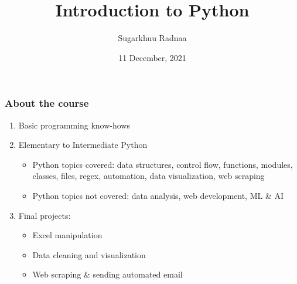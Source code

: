 \documentclass{beamer}
\title[Python Intro]{Introduction to Python} %
\author{Sugarkhuu Radnaa} %
\institute[] %
{
Py4Econ in Ulaanbaatar \\ %
\medskip
\textit{py4econ@gmail.com} %
}
\date{11 December, 2021}  %
\begin{document}
\begin{frame}
\titlepage %
\end{frame}

\begin{frame}
\frametitle{About the course} %
\begin{enumerate}
    \item Basic programming know-hows
    \item Elementary to Intermediate Python
        \begin{itemize}
            \item Python topics covered: data structures, control flow, functions, modules, classes, files, regex, automation, data visualization, web scraping
            \item Python topics not covered: data analysis, web development, ML & AI
        \end{itemize}
    \item Final projects:
        \begin{itemize}
            \item Excel manipulation 
            \item Data cleaning and visualization 
            \item Web scraping & sending automated email
        \end{itemize}
\end{enumerate}
\end{frame}
\end{document}
